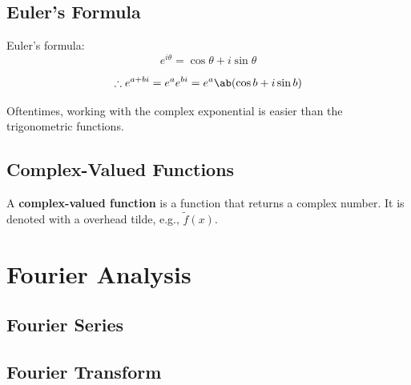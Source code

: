 \documentclass[a4paper, titlepage]{book}
\begin{document}
\section{Euler's Formula}

Euler's formula:
\begin{equation}
    e^{i \theta} = \cos\theta + i \sin\theta
\end{equation}

\begin{equation}
    \therefore e^{a + bi} = e^a e^{bi} = e^a \ab(\cos b + i \sin b)
\end{equation}

Oftentimes, working with the complex exponential is easier than the
trigonometric functions.

\section{Complex-Valued Functions}

A \textbf{complex-valued function} is a function that returns a complex number.
It is denoted with a overhead tilde, e.g., \(\tilde{f}(x)\).

\chapter{Fourier Analysis}

\section{Fourier Series}

\section{Fourier Transform}

\backmatter

\printbibliography[
    heading=bibintoc,
    title={References},
]
\end{document}
